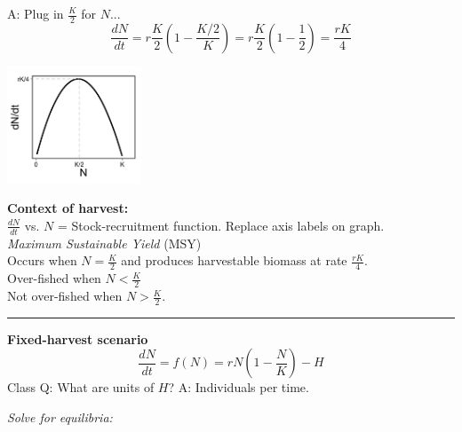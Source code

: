 \documentclass{article}
\newcommand{\note}[1]{\colorbox{gray!30}{#1}}
\newcommand{\ind}{\-\hspace{1cm}}
\begin{document}
\note{A:} Plug in $\frac{K}{2}$ for $N$...
\begin{equation*}
	\frac{dN}{dt}=r\frac{K}{2}\left(1-\frac{K/2}{K}\right)=r\frac{K}{2}\left(1-\frac{1}{2}\right)=\frac{rK}{4}
\end{equation*}
\begin{center}
\includegraphics[width=4cm]{figs/dNdt.jpg}
\end{center}
\textbf{Context of harvest:}\\
$\frac{dN}{dt}$ vs. $N$  = Stock-recruitment function. \note{Replace axis labels on graph.}\\
\emph{Maximum Sustainable Yield} (MSY)\\
\ind Occurs when $N=\frac{K}{2}$ and produces harvestable biomass at rate $\frac{rK}{4}$.\\
\ind Over-fished when $N<\tfrac{K}{2}$\\
\ind Not over-fished when $N>\tfrac{K}{2}$.

\rule[0.5ex]{\linewidth}{1pt}

\textbf{Fixed-harvest scenario}
\begin{equation*}
	\frac{dN}{dt}=f(N)=rN\left(1-\frac{N}{K}\right)-H
\end{equation*}
\note{Class Q:} What are units of $H$? \note{A:} Individuals per time.
\vspace{0.5cm}

\emph{Solve for equilibria:}
\end{document}
